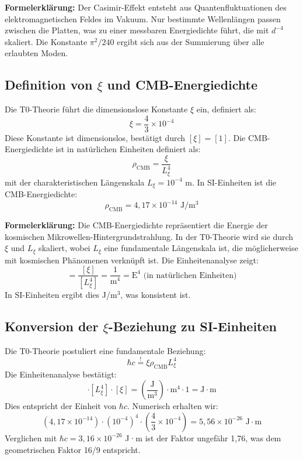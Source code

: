 	\textbf{Formelerklärung:} Der Casimir-Effekt entsteht aus Quantenfluktuationen des elektromagnetischen Feldes im Vakuum. Nur bestimmte Wellenlängen passen zwischen die Platten, was zu einer messbaren Energiedichte führt, die mit $d^{-4}$ skaliert. Die Konstante $\pi^2/240$ ergibt sich aus der Summierung über alle erlaubten Moden.
	
	\subsection{Definition von $\xi$ und CMB-Energiedichte}
	Die T0-Theorie führt die dimensionslose Konstante $\xi$ ein, definiert als:
	\begin{equation}
		\xi = \frac{4}{3} \times 10^{-4}
	\end{equation}
	Diese Konstante ist dimensionslos, bestätigt durch $[\xi] = [1]$. Die CMB-Energiedichte ist in natürlichen Einheiten definiert als:
	\begin{equation}
		\rho_{\text{CMB}} = \frac{\xi}{L_\xi^4}
	\end{equation}
	mit der charakteristischen Längenskala $L_\xi = 10^{-4}$ m. In SI-Einheiten ist die CMB-Energiedichte:
	\begin{equation}
		\rho_{\text{CMB}} = 4,17 \times 10^{-14} \text{ J}/\text{m}^3
	\end{equation}
	
	\textbf{Formelerklärung:} Die CMB-Energiedichte repräsentiert die Energie der kosmischen Mikrowellen-Hintergrundstrahlung. In der T0-Theorie wird sie durch $\xi$ und $L_\xi$ skaliert, wobei $L_\xi$ eine fundamentale Längenskala ist, die möglicherweise mit kosmischen Phänomenen verknüpft ist. Die Einheitenanalyse zeigt:
	\begin{equation}
		[\rho_{\text{CMB}}] = \frac{[\xi]}{[L_\xi^4]} = \frac{1}{\text{m}^4} = \text{E}^4 \text{ (in natürlichen Einheiten)}
	\end{equation}
	In SI-Einheiten ergibt dies J/m$^3$, was konsistent ist.
	
	\subsection{Konversion der $\xi$-Beziehung zu SI-Einheiten}
	Die T0-Theorie postuliert eine fundamentale Beziehung:
	\begin{equation}
		\hbar c \stackrel{!}{=} \xi \rho_{\text{CMB}} L_\xi^4
	\end{equation}
	Die Einheitenanalyse bestätigt:
	\begin{equation}
		[\rho_{\text{CMB}}] \cdot [L_\xi^4] \cdot [\xi] = \left( \frac{\text{J}}{\text{m}^3} \right) \cdot \text{m}^4 \cdot 1 = \text{J} \cdot \text{m}
	\end{equation}
	Dies entspricht der Einheit von $\hbar c$. Numerisch erhalten wir:
	\begin{equation}
		\left( 4,17 \times 10^{-14} \right) \cdot \left( 10^{-4} \right)^4 \cdot \left( \frac{4}{3} \times 10^{-4} \right) = 5,56 \times 10^{-26} \text{ J} \cdot \text{m}
	\end{equation}
	Verglichen mit $\hbar c = 3,16 \times 10^{-26}$ J·m ist der Faktor ungefähr 1,76, was dem geometrischen Faktor 16/9 entspricht.
	
